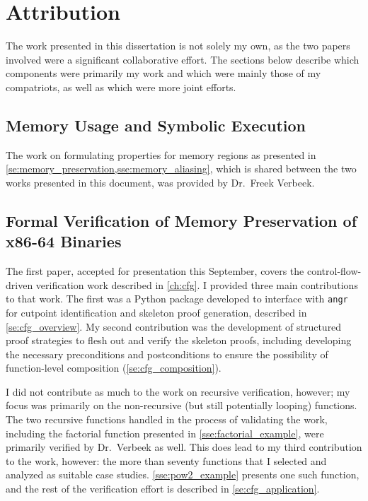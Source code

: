 \chapter{Attribution}\label{attribution}
The work presented in this dissertation is not solely my own,
as the two papers involved were a significant collaborative effort.
The sections below describe which components were primarily my work
and which were mainly those of my compatriots, as well as which were more joint efforts.

\section*{Memory Usage and Symbolic Execution}
The work on formulating properties for memory regions
as presented in \cref{se:memory_preservation,sse:memory_aliasing},
which is shared between the two works presented in this document,
was provided by Dr.~Freek Verbeek.

\section*{Formal Verification of Memory Preservation of x86-64 Binaries}\label{attribute1}
The first paper, accepted for presentation this September,
covers the control-flow-driven verification work described in \cref{ch:cfg}.
I provided three main contributions to that work.
The first was a Python package developed to interface with \texttt{angr}
for cutpoint identification and skeleton proof generation,
described in \cref{se:cfg_overview}.
My second contribution was the development of structured proof strategies
to flesh out and verify the skeleton proofs,
including developing the necessary preconditions and postconditions to ensure
the possibility of function-level composition (\cref{se:cfg_composition}).

I did not contribute as much to the work on recursive verification, however;
my focus was primarily on the non-recursive (but still potentially looping) functions.
The two recursive functions handled in the process of validating the work,
including the factorial function presented in \cref{sse:factorial_example},
were primarily verified by Dr.~Verbeek as well.
This does lead to my third contribution to the work, however:
the more than seventy functions that I selected and analyzed as suitable case studies.
\cref{sse:pow2_example} presents one such function,
and the rest of the verification effort is described in \cref{se:cfg_application}.

